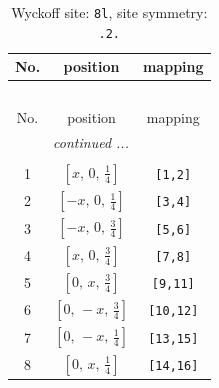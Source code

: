 \documentclass[fleqn,8pt]{jsarticle}
\begin{document}
\begin{longtable}{ccc}
\caption{Wyckoff site: {\tt 8l}, site symmetry: {\tt .2.}}
 \\
 \hline \hline
No. & position & mapping \\ \hline \endfirsthead

\multicolumn{2}{l}{\tablename\ \thetable{}} \\
 \hline \hline
No. & position & mapping \\ \hline \endhead

 \hline \hline
\multicolumn{2}{r}{\footnotesize\it continued ...} \\ \endfoot

 \hline \hline
\multicolumn{2}{r}{} \\ \endlastfoot

1 & $\left[ x,\, 0,\, \frac{1}{4} \right]$ & {\tt [1,2]} \\ \hline
2 & $\left[ - x,\, 0,\, \frac{1}{4} \right]$ & {\tt [3,4]} \\ \hline
3 & $\left[ - x,\, 0,\, \frac{3}{4} \right]$ & {\tt [5,6]} \\ \hline
4 & $\left[ x,\, 0,\, \frac{3}{4} \right]$ & {\tt [7,8]} \\ \hline
5 & $\left[ 0,\, x,\, \frac{3}{4} \right]$ & {\tt [9,11]} \\ \hline
6 & $\left[ 0,\, - x,\, \frac{3}{4} \right]$ & {\tt [10,12]} \\ \hline
7 & $\left[ 0,\, - x,\, \frac{1}{4} \right]$ & {\tt [13,15]} \\ \hline
8 & $\left[ 0,\, x,\, \frac{1}{4} \right]$ & {\tt [14,16]} \\
\end{longtable}
\renewcommand{\arraystretch}{1.2}
\end{document}
